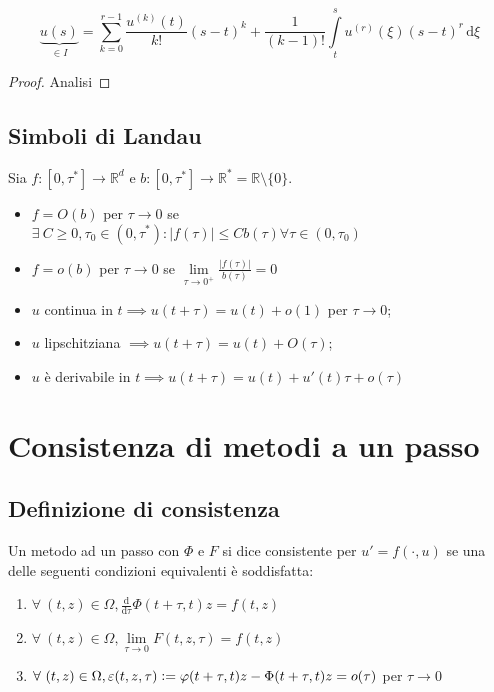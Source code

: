 \documentclass[hidelinks, 10pt]{report}
\begin{document}
\[ \underbrace{u(s)}_{\in I} = \sum\limits_{k = 0}^{r - 1} \frac{u^{(k)}(t)}{k!} (s - t)^{k} + \frac{1}{(k - 1)!} \int\limits_{t}^{s} u^{(r)} (\xi) (s - t)^{r} \, \mathrm{d}\xi \]

\begin{proof}
Analisi
\end{proof}

\subsection{Simboli di Landau}

Sia $ f: [0, \tau^{\ast}] \to \mathbb{R}^{d} $ e $ b: [0, \tau^{\ast}] \to \mathbb{R}^{\ast} = \mathbb{R} \setminus \{ 0 \} $.

\begin{itemize}
\item $ f = O (b) $ per $ \tau \to 0 $ se $ \exists\ C \ge 0, \tau_{0} \in (0, \tau^{\ast}) : \vert f(\tau) \vert \le C b(\tau) \forall \tau \in (0,\tau_0)$
\item $ f = o(b) $ per $ \tau \to 0 $ se $ \lim\limits_{\tau \to 0^{+}} \frac{\vert f(\tau) \vert}{b(\tau)} = 0 $
\end{itemize}

\begin{es}
\noindent
\begin{itemize}
\item $ u $ continua in $ t \implies u(t + \tau) = u(t) + o(1) $ per $ \tau \to 0 $;
\item $ u $ lipschitziana $ \implies u(t + \tau) = u(t) + O(\tau) $;
\item $ u $ \`e derivabile in $ t \implies u(t + \tau) = u(t) + u'(t) \tau + o(\tau) $
\end{itemize}
\end{es}

\section{Consistenza di metodi a un passo}
\subsection{Definizione di consistenza}

Un metodo ad un passo con $ \Phi $ e $ F $ si dice consistente per $ u' = f(\cdot, u) $ se una delle seguenti condizioni equivalenti \`e soddisfatta:

\begin{enumerate}
\item $ \forall\ (t, z) \in \Omega,  \frac{\mathrm{d}}{\mathrm{d} \tau} \Phi(t + \tau, t)z = f(t, z) $
\item $ \forall\ (t, z) \in \Omega, \lim\limits_{\tau \to 0} F(t, z, \tau) = f(t, z) $
\item $ \forall\ (t, z) \in \Omega, \varepsilon(t, z, \tau) \vcentcolon= \varphi(t + \tau, t)z - \Phi(t + \tau, t)z = o(\tau) $ per $ \tau \to 0 $
\end{enumerate}
\end{document}
